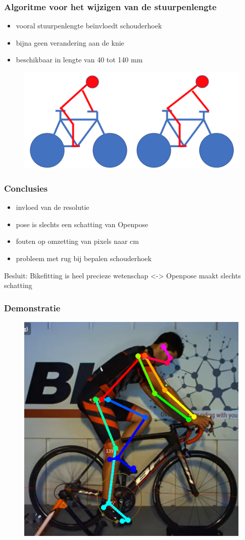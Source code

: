 \documentclass
   [kulak] %
   {kulakbeamer}
\begin{document}
\begin{frame}
	\frametitle{Algoritme voor het wijzigen van de stuurpenlengte}
	\begin{itemize}
		\item vooral stuurpenlengte beïnvloedt schouderhoek
		\item bijna geen verandering aan de knie
		\item beschikbaar in lengte van 40 tot 140 \si{mm}
	\end{itemize}
	\begin{figure}
		\includegraphics[width= \textwidth]{stuur.png}
	\end{figure}
\end{frame}

\begin{frame}
	\frametitle{Conclusies}
	\begin{itemize}
		\item invloed van de resolutie
		\item pose is slechts een schatting van Openpose
		\item fouten op omzetting van pixels naar \si{cm}
		\item probleem met rug bij bepalen schouderhoek
	\end{itemize}

	Besluit: Bikefitting is heel precieze wetenschap <-> Openpose maakt slechts schatting
\end{frame}

\begin{frame}
	\frametitle{Demonstratie}
	\begin{figure}
		\includegraphics[width= .55\textwidth]{prof_bikefit}
	\end{figure}
\end{frame}
\end{document}
